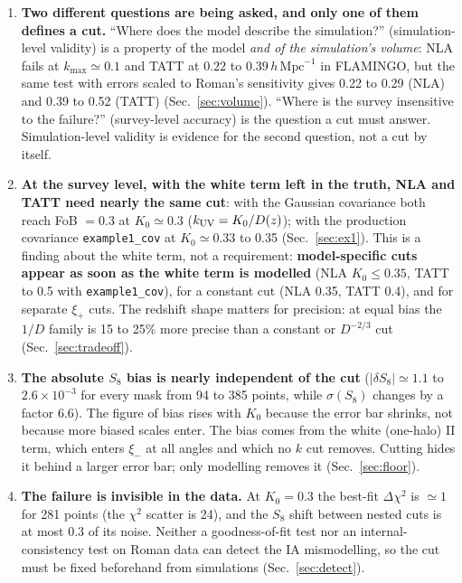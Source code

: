 \documentclass[11pt]{article}
\newcommand{\hmpc}{\,h\,\mathrm{Mpc}^{-1}}
\newcommand{\kmax}{k_{\max}}
\newcommand{\kuv}{k_{\rm UV}}
\newcommand{\dchi}{\Delta\chi^2}
\begin{document}
\begin{enumerate}[leftmargin=*,itemsep=2pt]
\item \textbf{Two different questions are being asked, and only one of them
  defines a cut.} ``Where does the model describe the simulation?''
  (simulation-level validity) is a property of the model \emph{and of the
  simulation's volume}: NLA fails at $\kmax \simeq 0.1$ and TATT at
  $0.22$ to $0.39\hmpc$ in FLAMINGO, but the same test with errors scaled to
  Roman's sensitivity gives 0.22 to 0.29 (NLA) and 0.39 to 0.52 (TATT)
  (Sec.~\ref{sec:volume}).
  ``Where is the survey insensitive to the failure?'' (survey-level
  accuracy) is the question a cut must answer. Simulation-level validity is
  evidence for the second question, not a cut by itself.
\item \textbf{At the survey level, with the white term left in the truth,
  NLA and TATT need nearly the same cut}: with the Gaussian covariance both
  reach FoB $= 0.3$ at $K_0 \simeq 0.3$ ($\kuv = K_0/D(z)$); with the
  production covariance \texttt{example1\_cov} at $K_0 \simeq 0.33$ to 0.35
  (Sec.~\ref{sec:ex1}). This is a finding about the white term, not a
  requirement: \textbf{model-specific cuts appear as soon as the white term
  is modelled} (NLA $K_0 \le 0.35$, TATT to 0.5 with \texttt{example1\_cov}),
  for a constant cut (NLA 0.35, TATT 0.4), and for separate $\xi_+$ cuts. The
  redshift shape matters for precision: at equal bias the $1/D$ family is 15
  to 25\% more precise than a constant or $D^{-2/3}$ cut
  (Sec.~\ref{sec:tradeoff}).
\item \textbf{The absolute $S_8$ bias is nearly independent of the cut}
  ($|\delta S_8| \simeq 1.1$ to $2.6\times10^{-3}$ for every mask from 94 to
  385 points, while $\sigma(S_8)$ changes by a factor 6.6). The figure of bias
  rises with $K_0$ because the error bar shrinks, not because more biased
  scales enter. The bias comes from the white (one-halo) II term, which
  enters $\xi_-$ at all angles and which no $k$ cut removes. Cutting hides it
  behind a larger error bar; only modelling removes it (Sec.~\ref{sec:floor}).
\item \textbf{The failure is invisible in the data.} At $K_0 = 0.3$ the
  best-fit $\dchi$ is $\simeq 1$ for 281 points (the $\chi^2$ scatter is 24),
  and the $S_8$ shift between nested cuts is at most $0.3$ of its noise.
  Neither a goodness-of-fit test nor an internal-consistency test on Roman
  data can detect the IA mismodelling, so the cut must be fixed beforehand
  from simulations (Sec.~\ref{sec:detect}).

\end{enumerate}
\end{document}

